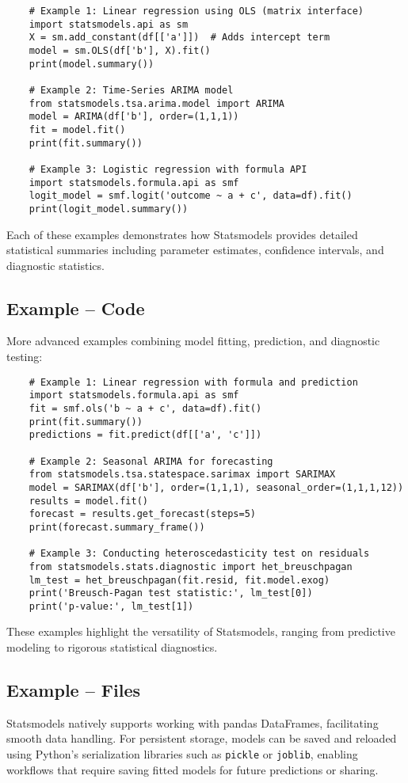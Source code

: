\begin{verbatim}
	# Example 1: Linear regression using OLS (matrix interface)
	import statsmodels.api as sm
	X = sm.add_constant(df[['a']])  # Adds intercept term
	model = sm.OLS(df['b'], X).fit()
	print(model.summary())
	
	# Example 2: Time-Series ARIMA model
	from statsmodels.tsa.arima.model import ARIMA
	model = ARIMA(df['b'], order=(1,1,1))
	fit = model.fit()
	print(fit.summary())
	
	# Example 3: Logistic regression with formula API
	import statsmodels.formula.api as smf
	logit_model = smf.logit('outcome ~ a + c', data=df).fit()
	print(logit_model.summary())
\end{verbatim}

Each of these examples demonstrates how Statsmodels provides detailed statistical summaries including parameter estimates, confidence intervals, and diagnostic statistics.

\subsection{Example -- Code}
More advanced examples combining model fitting, prediction, and diagnostic testing:

\begin{verbatim}
	# Example 1: Linear regression with formula and prediction
	import statsmodels.formula.api as smf
	fit = smf.ols('b ~ a + c', data=df).fit()
	print(fit.summary())
	predictions = fit.predict(df[['a', 'c']])
	
	# Example 2: Seasonal ARIMA for forecasting
	from statsmodels.tsa.statespace.sarimax import SARIMAX
	model = SARIMAX(df['b'], order=(1,1,1), seasonal_order=(1,1,1,12))
	results = model.fit()
	forecast = results.get_forecast(steps=5)
	print(forecast.summary_frame())
	
	# Example 3: Conducting heteroscedasticity test on residuals
	from statsmodels.stats.diagnostic import het_breuschpagan
	lm_test = het_breuschpagan(fit.resid, fit.model.exog)
	print('Breusch-Pagan test statistic:', lm_test[0])
	print('p-value:', lm_test[1])
\end{verbatim}

These examples highlight the versatility of Statsmodels, ranging from predictive modeling to rigorous statistical diagnostics.

\subsection{Example -- Files}
Statsmodels natively supports working with pandas DataFrames, facilitating smooth data handling. For persistent storage, models can be saved and reloaded using Python’s serialization libraries such as \texttt{pickle} or \texttt{joblib}, enabling workflows that require saving fitted models for future predictions or sharing.

